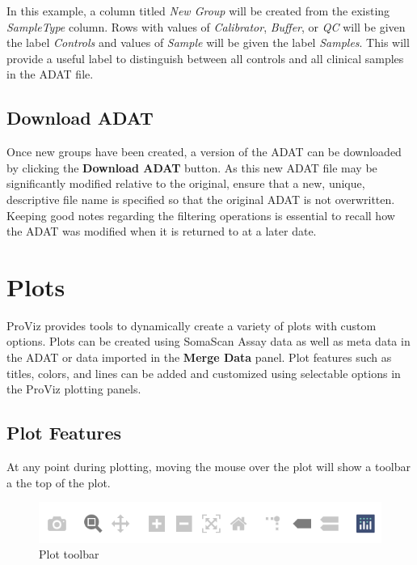 \documentclass[
]{book}
\begin{document}
In this example, a column titled \emph{New Group} will be created from the existing \emph{SampleType} column. Rows with values of \emph{Calibrator}, \emph{Buffer}, or \emph{QC} will be given the label \emph{Controls} and values of \emph{Sample} will be given the label \emph{Samples}. This will provide a useful label to distinguish between all controls and all clinical samples in the ADAT file.

\hypertarget{download-adat-2}{%
\section{Download ADAT}\label{download-adat-2}}

Once new groups have been created, a version of the ADAT can be downloaded by clicking the \textbf{Download ADAT} button. As this new ADAT file may be significantly modified relative to the original, ensure that a new, unique, descriptive file name is specified so that the original ADAT is not overwritten. Keeping good notes regarding the filtering operations is essential to recall how the ADAT was modified when it is returned to at a later date.

\hypertarget{plots}{%
\chapter{Plots}\label{plots}}

ProViz provides tools to dynamically create a variety of plots with custom options. Plots can be created using SomaScan Assay data as well as meta data in the ADAT or data imported in the \textbf{Merge Data} panel. Plot features such as titles, colors, and lines can be added and customized using selectable options in the ProViz plotting panels.

\hypertarget{plot-features}{%
\section{Plot Features}\label{plot-features}}

At any point during plotting, moving the mouse over the plot will show a toolbar a the top of the plot.

\begin{figure}
\centering
\includegraphics{images/modebar.png}
\caption{Plot toolbar}
\end{figure}
\end{document}
